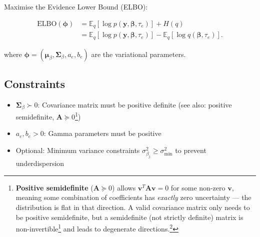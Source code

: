 \documentclass[11pt]{article}
\newcommand{\E}{\mathbb{E}}
\newcommand{\ELBO}{\text{ELBO}}
\begin{document}
Maximise the Evidence Lower Bound (ELBO):

\begin{align}
\ELBO(\bm{\phi})
&= \E_q[\log p(\bm{y}, \bm{\beta}, \tau_e)] + H(q) \\
&= \E_q[\log p(\bm{y}, \bm{\beta}, \tau_e)] - \E_q[\log q(\bm{\beta}, \tau_e)] .
\end{align}

where $\bm{\phi} = (\bm{\mu}_\beta, \bm{\Sigma}_\beta, a_e, b_e)$ are the variational parameters.

\subsection*{Constraints}

\begin{itemize}
\item $\bm{\Sigma}_\beta \succ 0$: Covariance matrix must be positive definite (see also: positive semidefinite, $\bm{A} \succeq 0$\footnote{\textbf{Positive semidefinite} ($\bm{A} \succeq 0$) allows $\bm{v}^T\bm{A}\bm{v} = 0$ for some non-zero $\bm{v}$, meaning some combination of coefficients has \emph{exactly} zero uncertainty --- the distribution is flat in that direction. A valid covariance matrix only needs to be positive semidefinite, but a semidefinite (not strictly definite) matrix is non-invertible\footnote{A matrix is \textbf{invertible} if $\bm{A}^{-1}$ exists, meaning the equation $\bm{A}\bm{x}=\bm{b}$ has a unique solution for any $\bm{b}$. Equivalently: none of the eigenvalues are zero. The precision matrix $\bm{\Sigma}_\beta^{-1}$ appears in the ELBO and CAVI updates; if $\bm{\Sigma}_\beta$ is not invertible these computations fail.} and leads to degenerate directions.\footnote{A \textbf{degenerate direction} is a direction $\bm{v}$ in which the distribution has zero spread --- the posterior is completely certain that $\bm{v}^T\bm{\beta}$ takes one exact value with no uncertainty. Geometrically: the probability ellipsoid is flat (squashed to zero thickness) along $\bm{v}$. This corresponds to a zero eigenvalue and makes the covariance matrix singular (non-invertible). It usually signals numerical collapse or that the data perfectly determines some linear combination of $\bm{\beta}$.}})
\item $a_e, b_e > 0$: Gamma parameters must be positive
\item Optional: Minimum variance constraints $\sigma^2_{\beta_j} \geq \sigma^2_{\text{min}}$ to prevent underdispersion
\end{itemize}
\end{document}
